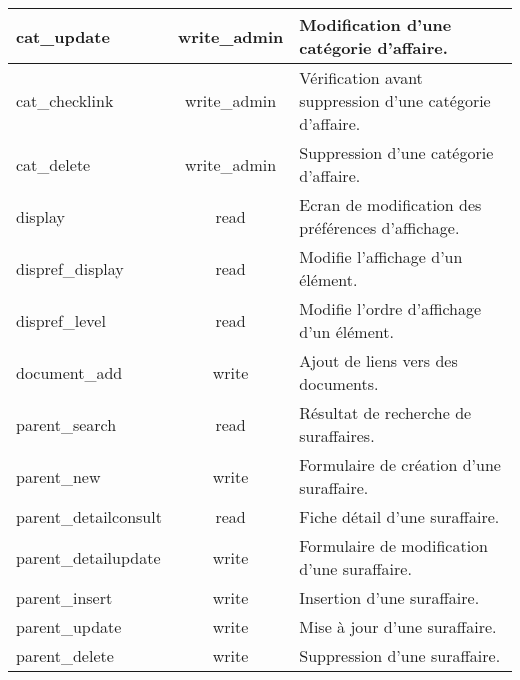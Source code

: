 \begin{tabular}{|l|c|p{9.5cm}|}
 \hline
  cat\_update & write\_admin & Modification d'une catégorie d'affaire. \\
 \hline
  cat\_checklink & write\_admin & Vérification avant suppression d'une catégorie d'affaire. \\
 \hline
  cat\_delete & write\_admin & Suppression d'une catégorie d'affaire. \\
 \hline
  display & read & Ecran de modification des préférences d'affichage. \\
 \hline
  dispref\_display & read & Modifie l'affichage d'un élément. \\
 \hline
  dispref\_level & read & Modifie l'ordre d'affichage d'un élément. \\
 \hline
  document\_add & write & Ajout de liens vers des documents. \\
 \hline
  parent\_search & read & Résultat de recherche de suraffaires. \\
 \hline
  parent\_new & write & Formulaire de création d'une suraffaire. \\
 \hline
  parent\_detailconsult & read & Fiche détail d'une suraffaire. \\
 \hline
  parent\_detailupdate & write & Formulaire de modification d'une suraffaire. \\
 \hline
  parent\_insert & write & Insertion d'une suraffaire. \\
 \hline
  parent\_update & write & Mise à jour d'une suraffaire. \\
 \hline
  parent\_delete & write & Suppression d'une suraffaire. \\
 \hline
\end{tabular}
